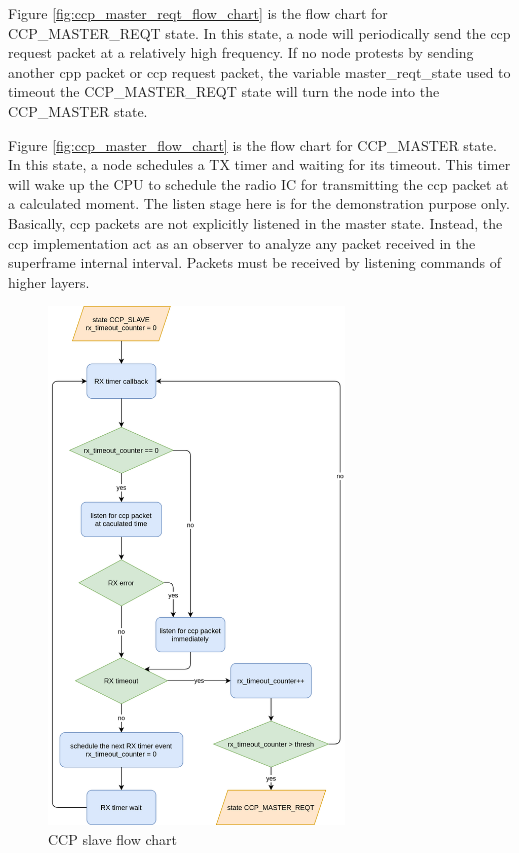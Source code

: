 \documentclass[\main/thesis.tex]{subfiles}
\begin{document}
Figure \ref{fig:ccp_master_reqt_flow_chart} is the flow chart for
CCP\_MASTER\_REQT state. In this state, a node will periodically send the ccp request packet at a relatively high frequency. If no node protests by sending another cpp packet or ccp request packet, the variable master\_reqt\_state used to timeout the CCP\_MASTER\_REQT state will turn the node into the CCP\_MASTER state.

Figure \ref{fig:ccp_master_flow_chart} is the flow chart for CCP\_MASTER state. In this state, a node schedules a TX timer and waiting for its timeout. This timer will wake up the CPU to schedule the radio IC for transmitting the ccp packet at a calculated moment. The listen stage here is for the demonstration purpose only. Basically, ccp packets are not explicitly listened in the master state. Instead, the ccp implementation act as an observer to analyze any packet received in the superframe internal interval. Packets must be received by listening commands of higher layers.

\begin{figure}[H]
    \begin{center}
        \includegraphics[width=0.7\textwidth]{ccp_slave_flow_chart.png}
    \end{center}
    \caption{CCP slave flow chart}
    \label{fig:ccp_slave_flow_chart}
\end{figure}
\end{document}
